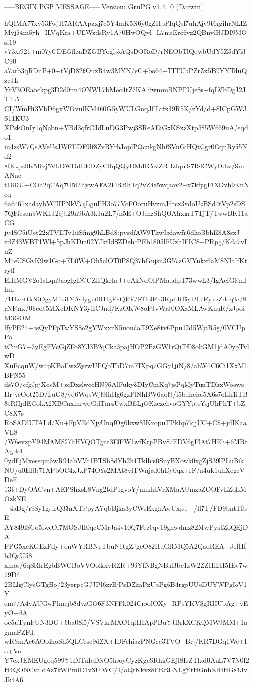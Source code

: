 -----BEGIN PGP MESSAGE-----
Version: GnuPG v1.4.10 (Darwin)

hQIMA77xv53FwjH7ARAApzxj7c5Y4mK5N6y0gZHbPIqQsf7uhAjv9t6rgihrNLIZ
Myj64m5yh+ILVqKra+UEWzdsRy1A70HwOQvl+L7msErc6vz2QBnvlHJDI9MOsi19
v73xi921+m07yCDEGflzaDZGBYoglj3AQsDORoD/rNEObTlQqwbUdY5Z5dYl3C90
a7arb3qRDiiP+0+tVjD826OuzB4w3MYN/yC+bo64+TITUbPZrZx5B9YYTduQzcJL
YrV3OEabckpg3D2d0nn4ONWh7bMoc4tZ3KA7fwmmBNPPUje8s+fqLVbDgJ2JT1x5
CI/WmHt3VbD6gxWOvuIKM460G5yWULGnqJFLrfx39R5K/zYd/d+8ICpGWJS11KU3
XPskOnIy1qNabn+VBd3qfrCJdLuDG3Pwj3SReAEiGxKSxzXtp585W669uA/eqdo1
m4zsW7QsAVeUsJWFEDF9lf8ZvRYrbJoplPQcnkgNhfSVuGiHQtCgr0OqnRy55Nd2
8fKzpz9lx5Rzj5VkOWDdBEDZyCflqQQyDMdICcvZRHzhpnS7ISlCWyDdw/SmANnc
t16DU+COa2qCAq7U5i2RywAFA2I4RBhTq2vZ4e5wqaav2+x7kfpgFiXDvh9KnNcq
6a6461xadaybVCIIPNkV7qLguPH3o77VcFOoruHvzmJdrcz3vdoUzBSd4tVp2sDS
7QFfcscnbWKllJ2ejb29n9bA3kJu2L7/n5E+OJmzShQOAhxmT7TjT/TwwBK11aCG
jv4SC5iUot22xTVETv1ifSfmg9hLBd8tpvsdfAW9TkwIzdawfn6dkoBbhESA8sxJ
zdZ43WBT1Wl+5pJhKDm02YJkfIdSZDehrPEb1805lFUzhIFIC8+PRpg/Kda7vIuZ
M4eUSGvK9w1Go+EL0W+Oh5clOT0P8Q37hGujsu3G57zGVYnkx6aM8NIaIfKtryff
ElHMGV2o1sLqn9aagIgDCCZlIQkrheJ+eAkNdOlPMaudpT73wwL3/IgAefGFmIhm
/1HwrttkNiOgyM1si1YAvfygn6RHgFxQPE/FfT4Fh3KphRf6yh9+EyxzZdeq9c/8
rNFmx/0bedt5MXcDKNY3yiIC9nd/KzOKW8oFJvWrJ0OXzMLAwKnuR/zJpoiM3GOM
lfyPE24+csQyPFpTwYS8o2gYWxxrK5uoudaT9Xe8tv6Ppu12d5WjtR5g/0VCUpPa
tCmG7+3yEgEVcGjZFo8YJ3B2qCka3pajHOP2BzGW1rQiTf08obGM1jdA0ypTvlwD
XuEcquW/w4pKBaEwzZyrwUPQbTbD7mFIXpq7GGy1jiN/8/ahW1C6Ci1XxMlBFN55
ds7O/cfgJpjXocM+zcDxslwceHN95AIFuky3DIyCmKq7jsPqMyTunTDkxWoawoHr
vcOot25D/LuG8/yq6WqsWjl9lhHg6gzPlNhBW6aql9/l5buhciof5X6s7oLh1iTB
8sRHjdEGokA2XBCuxmrwqGdTm4UwxBELjOKzczchvoGYYptsYsjUhPhT+bZC8X7s
RoSADlUTALd/Xu+FpVEdNjyUnqfOg6bxw8IKxopuTPkhp7lqjUC+CS+jdIKaaVL8
/W6evzpV94MAM827hHVQOTgnt3ElFW1wfKrpPBv87FDV6gFlAt7HEh+6MRrAgrk4
0ydEjMxossqm5wR94abVVc1BTSh8dYh2h4Tklhfs0SnyBXowk0xgZjS39lPLuBik
NU/u0EHb71XPbOC4xJxP74OYs2MAt8vfTWnjed0hDy0qx+rF/n4uk1uhXegcVDeE
13t+DyOACvn+AEPShxsL8Vng2tdPogvoY/nnkhhVrXMaAUmzaZOOFvLZqLMOzkNE
+4aDg/r9Sy1gJirQ33nXTPpyAYqbBjka3yCWsEkghAwUxpT+/lf7T/FD9bntTfbE
AY849lSGo5fwcOl7MOSJH0qcCMrJa4v10Q7Fez0qv19ghwdmz82MwPyatZoQEjDA
FPG5xeKGEzPdy+qnWYRBNpTbuN1tgZJgeO82HuGRMQ5A2QaoREA+JofHfb3QcU58
xmos/6qSRlrEgbBWCBoVVOolkxyRZR+96YfNBgNBhBbc1zW2ZZHiLH5IEv7w79Dd
2BLlgClycGTgHo/23yerpcGJJPI6zrBjPsDZkaPzUbPg6B4rgpUUoDUYWPgIoV1Y
em7/A4vAUGwPlmejb8dvzGO6F3NFFk024CiooIOXy+RPsYKVSgRHUbAg+vEyO+dA
oe5uTynPUN3DG+6ba08i5/VSVkrMXO1qHHApPBuYJBrkXCKQMW9MM+1agmaFZFdi
wRSmAc6AOoIhoSh5QLCcsc9dZX+IDFchiozPNGcc3TVO+Brj/KR7DGq1We+Io+Vn
Y7exJEMEUgoq599Y1DfTuIcDNO5hsoyCygKgcSRhkGEjl8IeZTlxd0AuL7V7N0f2
H4QONCvaldAz7kWPmlD1v3UiWC/4/aQtKkvz8FRRLNLgYtHGnhXRiHGz1JvJk4A6
